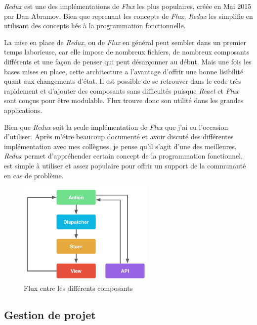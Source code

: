 \bigskip

\emph{Redux} est une des implémentations de \emph{Flux} les plus
populaires, créée en Mai 2015 par Dan Abramov. Bien que reprenant les
concepts de \emph{Flux}, \emph{Redux} les simplifie en utilisant des
concepts liés à la programmation fonctionnelle.

\bigskip

La mise en place de \emph{Redux}, ou de \emph{Flux} en général peut
sembler dans un premier temps laborieuse, car elle impose de nombreux
fichiers, de nombreux composants différents et une façon de penser qui
peut désarçonner au début. Mais une fois les bases mises en place, cette
architecture a l'avantage d'offrir une bonne lisibilité quant aux
changements d'état. Il est possible de se retrouver dans le code très
rapidement et d'ajouter des composants sans difficultés puisque
\emph{React} et \emph{Flux} sont conçus pour être modulable. Flux trouve
donc son utilité dans les grandes applications.

\bigskip

Bien que \emph{Redux} soit la seule implémentation de \emph{Flux} que
j'ai eu l'occasion d'utiliser. Après m'étre beaucoup documenté et avoir
discuté des différentes implémentation avec mes collègues, je pense
qu'il s'agit d'une des meilleures. \emph{Redux} permet d'appréhender
certain concept de la programmation fonctionnel, est simple à utiliser
et assez populaire pour offrir un support de la communauté en cas de
problème.

\bigskip

\begin{figure}[h]
  \centering
  \includegraphics[height=5cm]{figures/react.png}
  \caption{Flux entre les différents composants}
\end{figure}

\subsection{Gestion de projet}\label{gestion-de-projet}

